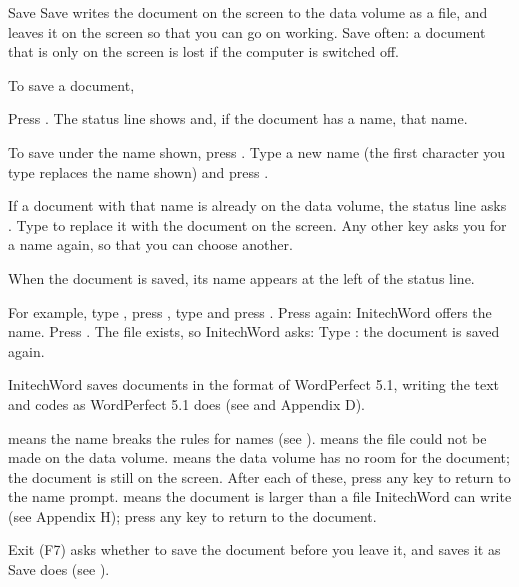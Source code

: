 \begin{Feature}{Save}
Save writes the document on the screen to the data volume as a file, and
leaves it on the screen so that you can go on working.  Save often: a
document that is only on the screen is lost if the computer is switched off.

To save a document,
\begin{WPSteps}
\item Press .  The status line shows  and, if the document has a name, that name.
\item To save under the name shown, press .
\Or
Type a new name (the first character you type replaces the name shown) and
press .
\item If a document with that name is already on the data volume, the status
line asks .  Type  to
replace it with the document on the screen.  Any other key asks you for a
name again, so that you can choose another.
\end{WPSteps}
When the document is saved, its name appears at the left of the status line.

For example, type , press , type
 and press .  Press 
again: InitechWord offers the name.
Press .  The file  exists, so InitechWord asks:
Type : the document is saved again.
\EndReplay

\Notes
{}
InitechWord saves documents in the format of WordPerfect 5.1, writing the
text and codes as WordPerfect 5.1 does (see  and Appendix D).

 means the name breaks the rules for names
(see ).   means the file could not
be made on the data volume.   means the data volume has no room for the document; the document
is still on the screen.  After each of these, press any key to return to
the name prompt.   means the document is
larger than a file InitechWord can write (see Appendix H); press any key to
return to the document.

Exit (F7) asks whether to save the document before you leave it, and saves
it as Save does (see ).

\end{Feature}

